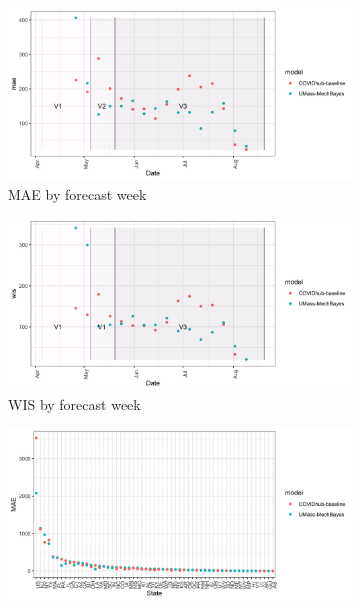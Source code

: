 \documentclass[11pt]{amsart}
\begin{document}
\begin{figure}
  \centering
     \begin{subfigure}{.5\textwidth}
  \centering
    \includegraphics[scale=.1]{mae_results_by_time_zero.png}
    \caption{MAE by forecast week}
\end{subfigure}%
\begin{subfigure}{.5\textwidth}
  \centering
    \includegraphics[scale=.1]{wis_results_by_time_zero.png}
    \caption{WIS by forecast week}
\end{subfigure}
\begin{subfigure}{.5\textwidth}
  \centering
    \includegraphics[scale=.1]{mae_results_by_region.png}

\end{subfigure}
\end{figure}
\end{document}
